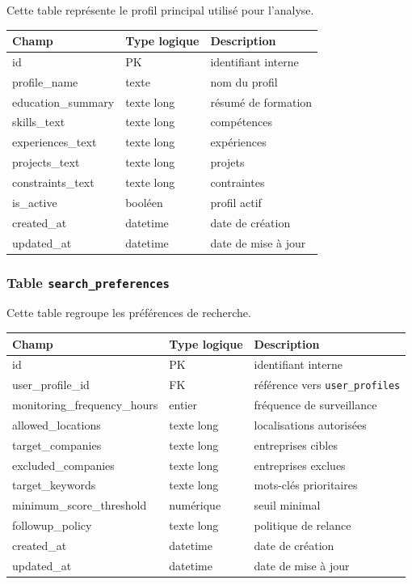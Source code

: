 \documentclass[11pt,a4paper]{article}
\begin{document}
Cette table représente le profil principal utilisé pour l’analyse.

\begin{center}
\begin{tabular}{|l|l|l|}
\hline
\textbf{Champ} & \textbf{Type logique} & \textbf{Description} \\
\hline
id & PK & identifiant interne \\
profile_name & texte & nom du profil \\
education_summary & texte long & résumé de formation \\
skills_text & texte long & compétences \\
experiences_text & texte long & expériences \\
projects_text & texte long & projets \\
constraints_text & texte long & contraintes \\
is_active & booléen & profil actif \\
created_at & datetime & date de création \\
updated_at & datetime & date de mise à jour \\
\hline
\end{tabular}
\end{center}

\subsubsection{Table \texttt{search\_preferences}}

Cette table regroupe les préférences de recherche.

\begin{center}
\begin{tabular}{|l|l|l|}
\hline
\textbf{Champ} & \textbf{Type logique} & \textbf{Description} \\
\hline
id & PK & identifiant interne \\
user_profile_id & FK & référence vers \texttt{user\_profiles} \\
monitoring_frequency_hours & entier & fréquence de surveillance \\
allowed_locations & texte long & localisations autorisées \\
target_companies & texte long & entreprises cibles \\
excluded_companies & texte long & entreprises exclues \\
target_keywords & texte long & mots-clés prioritaires \\
minimum_score_threshold & numérique & seuil minimal \\
followup_policy & texte long & politique de relance \\
created_at & datetime & date de création \\
updated_at & datetime & date de mise à jour \\
\hline
\end{tabular}
\end{center}
\end{document}
